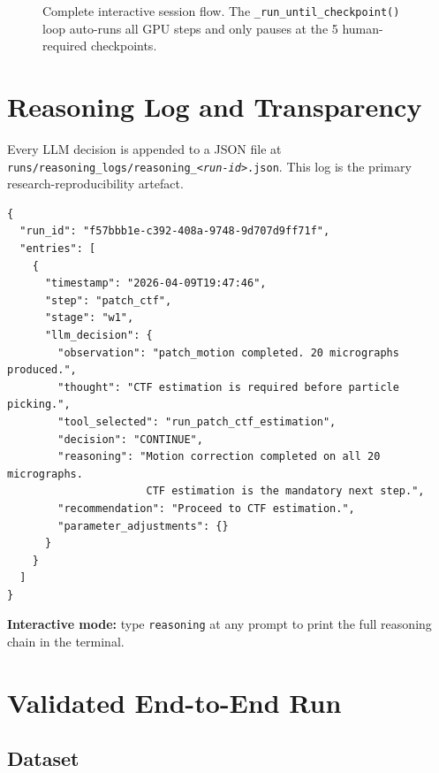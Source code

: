 \documentclass[12pt, a4paper]{article}
\begin{document}
\begin{figure}[H]
\begin{tikzpicture}[node distance=0.55cm and 1.8cm, scale=0.92,
                    transform shape]
\end{tikzpicture}
\caption{Complete interactive session flow. The
\texttt{\_run\_until\_checkpoint()} loop auto-runs all GPU steps and only
pauses at the 5 human-required checkpoints.}
\label{fig:interactive-flow}
\end{figure}

\section{Reasoning Log and Transparency}
\label{sec:reasoning}

Every LLM decision is appended to a JSON file at
\texttt{runs/reasoning\_logs/reasoning\_\textit{<run-id>}.json}.
This log is the primary research-reproducibility artefact.

\begin{lstlisting}[caption={Example reasoning log entry (abbreviated)},
  label=lst:reasoning-log]
{
  "run_id": "f57bbb1e-c392-408a-9748-9d707d9ff71f",
  "entries": [
    {
      "timestamp": "2026-04-09T19:47:46",
      "step": "patch_ctf",
      "stage": "w1",
      "llm_decision": {
        "observation": "patch_motion completed. 20 micrographs produced.",
        "thought": "CTF estimation is required before particle picking.",
        "tool_selected": "run_patch_ctf_estimation",
        "decision": "CONTINUE",
        "reasoning": "Motion correction completed on all 20 micrographs.
                      CTF estimation is the mandatory next step.",
        "recommendation": "Proceed to CTF estimation.",
        "parameter_adjustments": {}
      }
    }
  ]
}
\end{lstlisting}

\noindent
\textbf{Interactive mode:} type \texttt{reasoning} at any prompt to print the
full reasoning chain in the terminal.

\section{Validated End-to-End Run}
\label{sec:results}

\subsection{Dataset}
\end{document}

